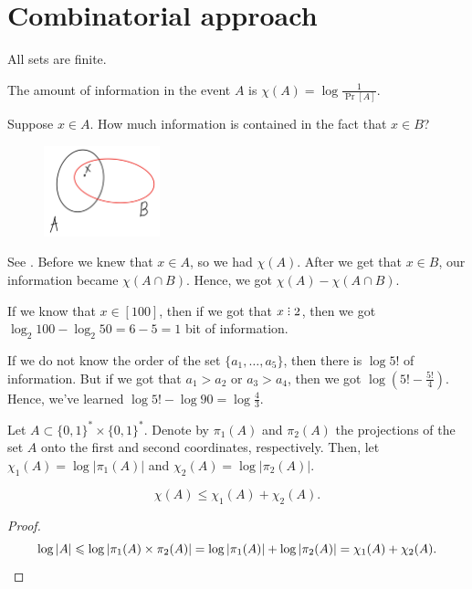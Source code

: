 
\section{Combinatorial approach}

All sets are finite.

\begin{definition}[Hartley, 1928]
    The amount of information in the event $A$ is $\chi(A) = \log \frac{1}{\Pr[A]}$.
\end{definition}

\begin{example}
    Suppose $x \in A$.
    How much information is contained in the fact that $x \in B$?
    \begin{figure}[H]
        \centering
        \includegraphics[width=0.3\textwidth]{figures/9268759F-085F-474A-94DD-01FC01C993CA}
        \caption{}
        \label{fig:4cd10f6d-3092-4fca-9f75-1e135943f348}
    \end{figure}

    See .
    Before we knew that $x \in A$, so we had  $\chi(A)$.
    After we get that $x \in B$, our information became $\chi(A \cap B)$.
    Hence, we got $\chi(A) - \chi(A \cap B)$.
\end{example}

\begin{example}
    If we know that $x \in [100]$, then if we got that $x \divby 2$, then we got  $\log_2 100 - \log_2 50 = 6 - 5 = 1$ bit of information.
\end{example}

\begin{example}
    If we do not know the order of the set $\{a_1, \ldots, a_5\}$, then there is $\log 5!$ of information.
    But if we got that $a_1 > a_2$ or $a_3 > a_4$, then we got $\log (5! - \frac{5!}{4})$.
    Hence, we've learned $\log 5! - \log 90 = \log \frac{4}{3}$.
\end{example}

\begin{definition}
    Let $A \subset \{0, 1\}^* \times \{0, 1\}^*$.
    Denote by $\pi_1(A)$ and $\pi_2(A)$ the projections of the set $A$ onto the first and second coordinates, respectively.
    Then, let $\chi_1(A) = \log |\pi_1(A)|$ and $\chi_2(A) = \log |\pi_2(A)|$.
\end{definition}
\begin{theorem}
    \[\chi(A) \leq \chi_1(A) + \chi_2(A).\]
\end{theorem}
\begin{proof}
    \[
        \log |A| \leq \log |\pi_1(A) \times \pi_2(A)| = \log |\pi_1(A)| + \log |\pi_2(A)| = \chi_1(A) + \chi_2(A). \qedhere
    \]
\end{proof}


